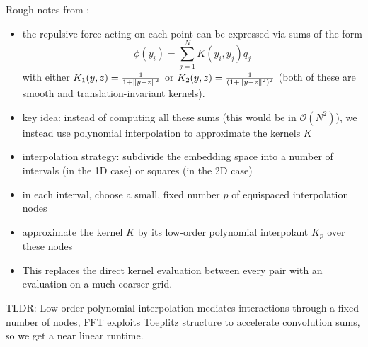 Rough notes from \cite{Lin19}: 
\begin{itemize}
    \item the repulsive force acting on each point can be expressed via sums of the form \begin{equation}
        \phi(y_i) = \sum_{j=1}^N K(y_i, y_j) q_j 
    \end{equation}
    with either $K_1(y,z) = \frac{1}{1+\lVert y-z\rVert^2}$ or $K_2(y,z) = \frac{1}{(1+\lVert y-z\rVert^2)^2}$ (both of these are smooth and translation-invariant kernels). 
    \item key idea: instead of computing all these sums (this would be in $\mathcal{O}(N^2)$), we instead use polynomial interpolation to approximate the kernels $K$ 
    \item interpolation strategy: subdivide the embedding space into a number of intervals (in the 1D case) or squares (in the 2D case)
    \item in each interval, choose a small, fixed number $p$ of equispaced interpolation nodes 
    \item approximate the kernel $K$ by its low-order polynomial interpolant $K_p$ over these nodes 
    \item This replaces the direct kernel evaluation between every pair with an evaluation on a much coarser grid.
\end{itemize}
TLDR: Low-order polynomial interpolation mediates interactions through a fixed number of nodes, FFT exploits Toeplitz structure to accelerate convolution sums, so we get a near linear runtime. 


